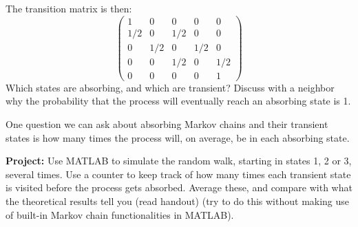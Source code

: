 \documentclass[12pt]{report}
\begin{document}
The transition matrix is then: 
 $$\left(\begin{array}{ccccc}1 & 0 & 0 & 0 & 0 \\1/2 & 0 & 1/2 & 0 & 0 \\0 & 1/2 & 0 & 1/2 & 0 \\0 & 0 & 1/2 & 0 & 1/2 \\0 & 0 & 0 & 0 & 1\end{array}\right)$$
Which states are absorbing, and which are transient? Discuss with a neighbor why the probability that the process will eventually reach an absorbing state is 1.\\
\vspace{2mm}

One question we can ask about absorbing Markov chains and their transient states is how many times the process will, on average, be in each absorbing state.\\
\vspace{2mm}

\textbf{Project:}  Use MATLAB to simulate the random walk, starting in states 1, 2 or 3, several times.  Use a counter to keep track of how many times each transient state is visited before the process gets absorbed.  Average these, and compare with what the theoretical results tell you (read handout) (try to do this without making use of built-in Markov chain functionalities in MATLAB). 
\end{document}
